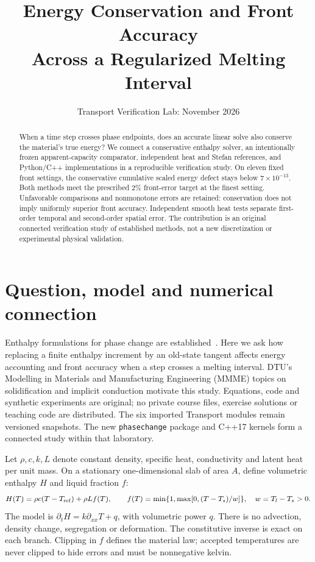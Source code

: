 \documentclass[10pt,a4paper]{article}
\title{Energy Conservation and Front Accuracy\\Across a Regularized Melting Interval}
\author{}
\date{Transport Verification Lab: November 2026}
\begin{document}
\maketitle
\begin{abstract}
When a time step crosses phase endpoints, does an accurate linear solve also
conserve the material's true energy? We connect a conservative enthalpy solver,
an intentionally frozen apparent-capacity comparator, independent heat and
Stefan references, and Python/C++ implementations in a reproducible verification
study. On eleven fixed front settings, the conservative cumulative scaled
energy defect stays below $7\times10^{-13}$. Both methods meet the prescribed
2\% front-error target at the finest setting. Unfavorable comparisons and
nonmonotone errors are retained: conservation does not imply uniformly superior
front accuracy. Independent smooth heat tests separate first-order temporal and
second-order spatial error. The contribution is an original connected
verification study of established methods, not a new discretization or
experimental physical validation.
\end{abstract}
\section{Question, model and numerical connection}
Enthalpy formulations for phase change are established~\cite{voller}. Here we
ask how replacing a finite enthalpy increment by an old-state tangent affects
energy accounting and front accuracy when a step crosses a melting interval.
DTU's Modelling in Materials and Manufacturing Engineering (MMME) topics on
solidification and implicit conduction motivate this study. Equations, code
and synthetic experiments are original; no private course files, exercise
solutions or teaching code are distributed. The six imported Transport modules
remain versioned snapshots. The new \texttt{phasechange} package and C++17
kernels form a connected study within that laboratory.

Let $\rho,c,k,L$ denote constant density, specific heat, conductivity and
latent heat per unit mass. On a stationary one-dimensional slab of area $A$,
define volumetric enthalpy $H$ and liquid fraction $f$:
\begin{equation}
H(T)=\rho c(T-T_{\rm ref})+\rho Lf(T),\qquad
f(T)=\min\{1,\max[0,(T-T_s)/w]\},\quad w=T_l-T_s>0.
\end{equation}
The model is $\partial_tH=k\partial_{xx}T+q$, with volumetric power $q$.
There is no advection, density change, segregation or deformation.
The constitutive inverse is exact on each branch. Clipping in $f$ defines the
material law; accepted temperatures are never clipped to hide errors and must
be nonnegative kelvin.
\end{document}
